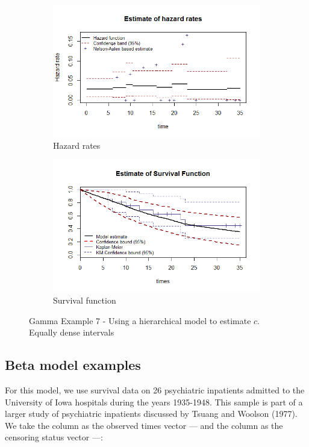 \documentclass[letterpaper]{article}\usepackage[]{graphicx}\usepackage[]{xcolor}
\begin{document}
\begin{figure}
  \centering
  \begin{subfigure}[a]{\textwidth}\centering
    \includegraphics[width=\textwidth]{G71.png}
    \caption{Hazard rates}
  \end{subfigure}
  \begin{subfigure}[b]{\textwidth}\centering
    \includegraphics[width=\textwidth]{G72.png}
    \caption{Survival function}
  \end{subfigure}
  \caption{Gamma Example 7 - Using a hierarchical model to estimate $c$. Equally dense intervals}
  \label{fig:G7}
\end{figure}


\subsection{Beta model examples}
For this model, we use survival data on 26 psychiatric inpatients admitted to the University of Iowa hospitals during the years 1935-1948. This sample is part of a larger study of psychiatric inpatients discussed by Tsuang and Woolson (1977). We take the  column as the observed times vector ---- and the  column as the censoring status vector ----:
\end{document}
